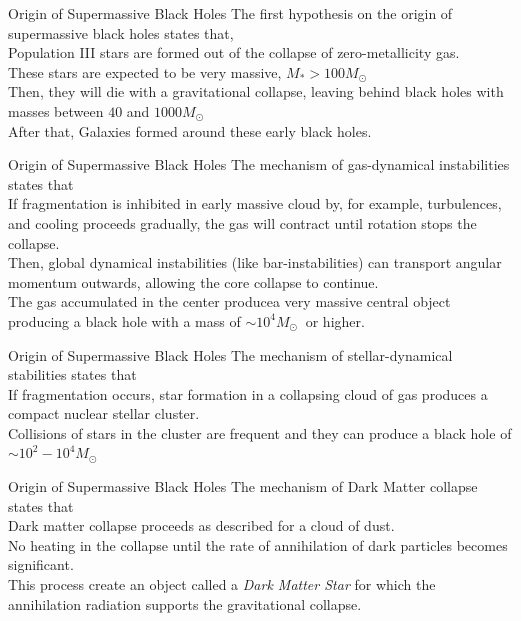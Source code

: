 \documentclass{beamer}
\begin{document}
\begin{frame}{Origin of Supermassive Black Holes}
	The first hypothesis on the origin of supermassive black holes states that,\\
	\bigskip
	\onslide<1-> Population III stars are formed out of the collapse of zero-metallicity gas.\\
	\pause
	\bigskip
	\onslide<2-> These stars are expected to be very massive, $M_* > 100 M_\odot\ $\\
	\pause
	\bigskip
	\onslide<3-> Then, they will die with a gravitational collapse, leaving behind black holes with masses between $40$ and $1000 M_\odot\ $ \\
	\pause
	\bigskip
	\onslide<4-> After that, Galaxies formed around these early black holes.
\end{frame}

\begin{frame}{Origin of Supermassive Black Holes}
	The mechanism of gas-dynamical instabilities states that\\
	\pause
	\bigskip
	\onslide<2-> If fragmentation is inhibited in early massive cloud by, for example, turbulences, and cooling proceeds gradually, the gas will contract until rotation stops the collapse.\\ 
	\pause
	\bigskip
	\onslide<3-> Then, global dynamical instabilities (like bar-instabilities) can transport angular momentum outwards, allowing the core collapse to continue.\\ 
	\pause
	\bigskip
	\onslide<4-> The gas accumulated in the center producea very massive central object producing a black hole with a mass of $ \sim 10^4 M_\odot\ $ or higher.
\end{frame}

\begin{frame}{Origin of Supermassive Black Holes}
	The mechanism of stellar-dynamical stabilities states that\\
	\pause
	\bigskip
	\onslide<2-> If fragmentation occurs, star formation in a collapsing cloud of gas produces a compact nuclear stellar cluster.\\ 
	\pause
	\bigskip
	\onslide<3-> Collisions of stars in the cluster are frequent and they can produce a black hole of $ \sim 10^2 - 10^4 M_\odot\ $ \\ 
\end{frame}

\begin{frame}{Origin of Supermassive Black Holes}
	The mechanism of Dark Matter collapse states that\\
	\pause
	\bigskip
	\onslide<2-> Dark matter collapse proceeds as described for a cloud of dust.\\ 
	\pause
	\bigskip
	\onslide<3-> No heating in the collapse until the rate of annihilation of dark particles becomes significant.\\ 
	\pause
	\bigskip
	\onslide<4-> This process create an object called a \textit{Dark Matter Star} for which the annihilation radiation supports the gravitational collapse.
\end{frame}
\end{document}
